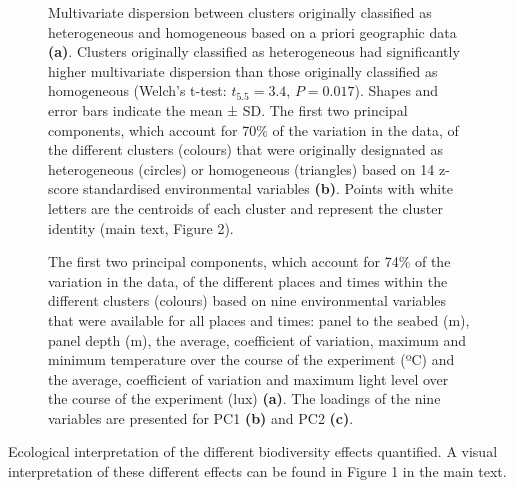 \documentclass[
  letterpaper,
  DIV=11,
  numbers=noendperiod]{scrartcl}
\begin{document}
\begin{figure}


\caption{\label{fig-s4}Multivariate dispersion between clusters
originally classified as heterogeneous and homogeneous based on a priori
geographic data \textbf{(a)}. Clusters originally classified as
heterogeneous had significantly higher multivariate dispersion than
those originally classified as homogeneous (Welch's t-test:
\(t_{5.5} = 3.4\), \(P = 0.017\)). Shapes and error bars indicate the
mean ± SD. The first two principal components, which account for 70\% of
the variation in the data, of the different clusters (colours) that were
originally designated as heterogeneous (circles) or homogeneous
(triangles) based on 14 z-score standardised environmental variables
\textbf{(b)}. Points with white letters are the centroids of each
cluster and represent the cluster identity (main text, Figure 2).}

\end{figure}%

\begin{figure}


\caption{\label{fig-s5}The first two principal components, which account
for 74\% of the variation in the data, of the different places and times
within the different clusters (colours) based on nine environmental
variables that were available for all places and times: panel to the
seabed (m), panel depth (m), the average, coefficient of variation,
maximum and minimum temperature over the course of the experiment (ºC)
and the average, coefficient of variation and maximum light level over
the course of the experiment (lux) \textbf{(a)}. The loadings of the
nine variables are presented for PC1 \textbf{(b)} and PC2 \textbf{(c)}.}

\end{figure}%

\begin{table}

\caption{\label{tbl-s1}Ecological interpretation of the different
biodiversity effects quantified. A visual interpretation of these
different effects can be found in Figure 1 in the main text.}


\end{table}%
\end{document}

